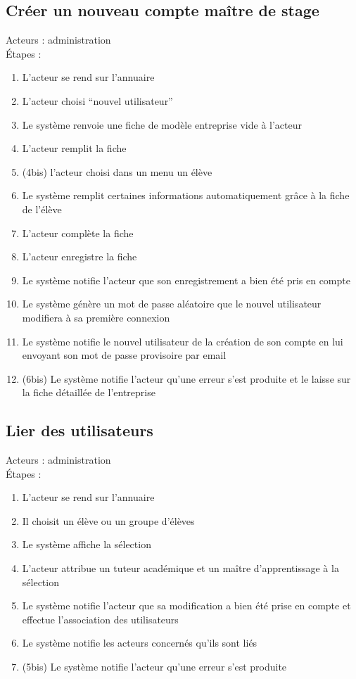 \documentclass{scrreprt}
\begin{document}
\subsection{Créer un nouveau compte maître de stage}
Acteurs : administration
\\
\'Etapes :
\begin{enumerate}
\item L’acteur se rend sur l’annuaire
\item L’acteur choisi “nouvel utilisateur”
\item Le système renvoie une fiche de modèle entreprise vide à l’acteur 
\item L’acteur remplit la fiche
\item (4bis) l’acteur choisi dans un menu un élève 
\item Le système remplit certaines informations automatiquement grâce à la fiche de l’élève
\item L’acteur complète la fiche
\item L’acteur enregistre la fiche
\item Le système notifie l’acteur que son enregistrement a bien été pris en compte
\item Le système génère un mot de passe aléatoire que le nouvel utilisateur modifiera à sa première connexion
\item Le système notifie le nouvel utilisateur de la création de son compte en lui envoyant son mot de passe provisoire par email
\item (6bis) Le système notifie l’acteur qu’une erreur s’est produite et le laisse sur la fiche détaillée de l’entreprise
\end{enumerate}


\subsection{ Lier des utilisateurs}
Acteurs : administration
\\
\'Etapes :
\begin{enumerate}
\item L’acteur se rend sur l’annuaire
\item Il choisit un élève ou un groupe d’élèves 
\item Le système affiche la sélection
\item L’acteur attribue un tuteur académique et un maître d’apprentissage à la sélection
\item Le système notifie l’acteur que sa modification a bien été prise en compte et effectue l’association des utilisateurs
\item Le système notifie les acteurs concernés qu’ils sont liés
\item (5bis) Le système notifie l’acteur qu’une erreur s’est produite 
\end{enumerate}
\end{document}
